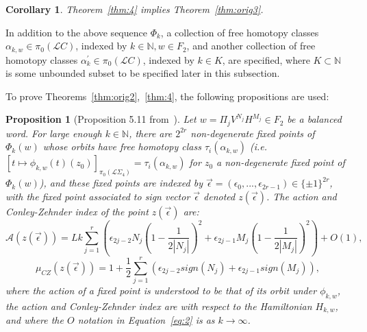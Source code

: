 \documentclass[11pt]{article}
\newtheorem{prop}[theorem]{Proposition}
\newtheorem*{corollary}{Corollary}
\newcommand{\N}{\mathbb{N}}
\begin{document}
            \begin{corollary}
                Theorem~\ref{thm:4} implies Theorem~\ref{thm:orig3}.
            \end{corollary}
            
            In addition to the above sequence $\Phi_k$, a collection of free homotopy classes $\alpha_{k,w} \in \pi_0(\mathscr{L}C)$, indexed by $k \in \N, w \in F_2$, and another collection of free homotopy classes $\alpha_k^\prime \in \pi_0(\mathscr{L}C)$, indexed by $k \in K$, are specified, where $K \subset \N$ is some unbounded subset to be specified later in this subsection.
            
            To prove Theorems~\ref{thm:orig2},~\ref{thm:4}, the following propositions are used:
            
            \begin{prop}[Proposition 5.11 from~\cite{10}]
            \label{prop:main}
                Let $w = \Pi_j V^{N_j} H^{M_j} \in F_2$ be a balanced word. For large enough $k \in \N$, there are $2^{2r}$ non-degenerate fixed points of $\Phi_k(w)$ whose orbits have free homotopy class $\tau_i(\alpha_{k,w})$ (i.e. $[t \mapsto \phi_{k,w}(t)(z_0)]_{\pi_0(\mathscr{L}\Sigma_4)} = \tau_i(\alpha_{k,w})$ for $z_0$ a non-degenerate fixed point of $\Phi_k(w)$), and these fixed points are indexed by $\vec{\epsilon} = (\epsilon_0,...,\epsilon_{2r-1}) \in \{\pm 1\}^{2r}$, with the fixed point associated to sign vector $\vec{\epsilon}$ denoted $z(\vec{\epsilon})$. The action and Conley-Zehnder index of the point $z(\vec\epsilon)$ are:
                \begin{equation}
                \label{eq:2}
                    \mathcal{A}(z(\vec{\epsilon})) = Lk \sum_{j=1}^r \left( \epsilon_{2j-2} N_j \left(1-\frac{1}{2|N_j|}\right)^2 + \epsilon_{2j-1} M_j \left(1-\frac{1}{2|M_j|}\right)^2 \right) + O(1) ,
                \end{equation}
                \begin{equation}
                \label{eq:3}
                    \mu_{CZ}(z(\vec\epsilon)) = 1 + \frac12 \sum_{j=1}^r \left( \epsilon_{2j-2} sign(N_j) + \epsilon_{2j-1} sign(M_j) \right) ,
                \end{equation}
                where the action of a fixed point is understood to be that of its orbit under $\phi_{k,w}$, the action and Conley-Zehnder index are with respect to the Hamiltonian $H_{k,w}$, and where the $O$ notation in Equation~\ref{eq:2} is as $k \to \infty$.
            \end{prop}
            
\end{document}
